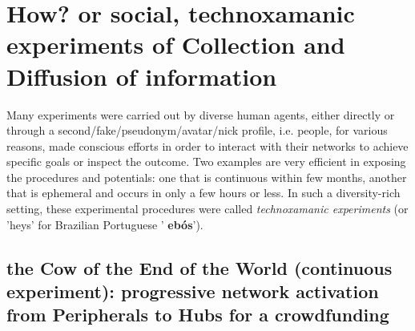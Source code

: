 \documentclass[a4paper]{article}
\begin{document}
\section{How? or social, technoxamanic experiments of Collection and Diffusion of information}
Many experiments were carried out by diverse human agents, either directly or
through a second/fake/pseudonym/avatar/nick profile, i.e. people, for various
reasons, made conscious efforts in order to interact with their networks to
achieve specific goals or inspect the outcome.  Two examples are very efficient
in exposing the procedures and potentials: one that is continuous within few
months, another that is ephemeral and occurs in only a few hours or less.  In such
a diversity-rich setting, these experimental procedures were called
\emph{technoxamanic experiments} (or 'heys' for Brazilian Portuguese '{\bf
ebós}').

\subsection{the Cow of the End of the World (continuous experiment):
progressive network activation from Peripherals to Hubs for a crowdfunding}\label{cont}
\end{document}
